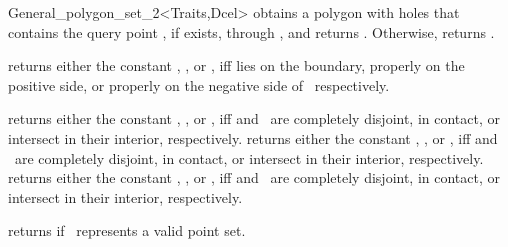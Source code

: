 \begin{ccRefClass}{General_polygon_set_2<Traits,Dcel>}
  {obtains a polygon with holes that contains the query point , 
   if exists, through , and returns . 
   Otherwise, returns .}

  {returns either the constant , 
   , or , iff  lies on 
   the boundary, properly on the positive side, or properly on the negative 
   side of \ccVar\ respectively.}

  {returns either the constant ,
   , or , iff 
    and \ccVar\ are completely disjoint, in contact, or
   intersect in their interior, respectively.}
\ccGlue
{}
  {returns either the constant ,
   , or , iff 
    and \ccVar\ are completely disjoint, in contact, or
   intersect in their interior, respectively.}
\ccGlue
{}
  {returns either the constant ,
   , or , iff 
    and \ccVar\ are completely disjoint, in contact, or
   intersect in their interior, respectively.}


  {returns  if \ccVar\ represents a valid point set.}

\ccSeeAlso
  \\
  \\

\end{ccRefClass}

\ccRefPageEnd
